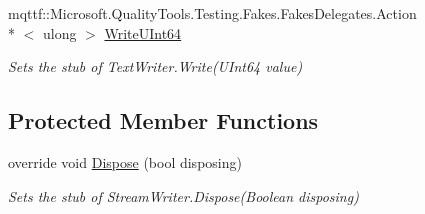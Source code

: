 \begin{DoxyCompactItemize}
mqttf\-::\-Microsoft.\-Quality\-Tools.\-Testing.\-Fakes.\-Fakes\-Delegates.\-Action\\*
$<$ ulong $>$ \hyperlink{class_system_1_1_i_o_1_1_fakes_1_1_stub_stream_writer_a85808941f821d1819c9f096b431c385d}{Write\-U\-Int64}
\begin{DoxyCompactList}\small\item\em Sets the stub of Text\-Writer.\-Write(\-U\-Int64 value)\end{DoxyCompactList}\end{DoxyCompactItemize}
\subsection*{Protected Member Functions}
\begin{DoxyCompactItemize}
\item 
override void \hyperlink{class_system_1_1_i_o_1_1_fakes_1_1_stub_stream_writer_ace3c88ebae775bfbe27b2fb76512fa8a}{Dispose} (bool disposing)
\begin{DoxyCompactList}\small\item\em Sets the stub of Stream\-Writer.\-Dispose(\-Boolean disposing)\end{DoxyCompactList}\end{DoxyCompactItemize}
